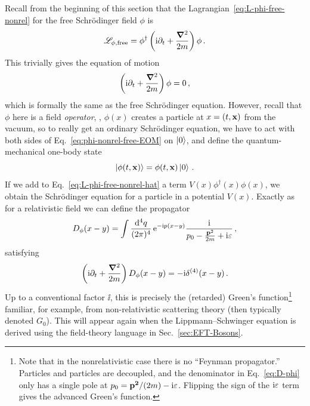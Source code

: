 Recall from the beginning of this section that the 
Lagrangian~\eqref{eq:L-phi-free-nonrel} for the free Schr\"odinger field 
$\phi$ is
%
\begin{equation}
 \LL_{\phi,\text{free}} = \phi^\dagger
 \left(\ii\partial_t + \frac{\Laplace}{2m}\right)\phi \,.
\label{eq:L-phi-free-nonrel-hat}
\end{equation}
%
This trivially gives the equation of motion
%
\begin{equation}
 \left(\ii\partial_t + \frac{\Laplace}{2m}\right)\phi = 0 \,,
\label{eq:phi-nonrel-free-EOM}
\end{equation}
%
which is formally the same as the free Schr\"odinger equation.  However, recall 
that $\phi$ here is a field \emph{operator}, \ie, $\phi(x)$ creates a particle 
at $x=(t,\mathbf{x})$ from the vacuum, so to really get an ordinary Schr\"odinger 
equation, we have to act with both sides of Eq.~\eqref{eq:phi-nonrel-free-EOM} 
on $\ket{0}$, and define the quantum-mechanical one-body state
%
\begin{equation}
 \ket{\phi(t,\mathbf{x})} = \phi(t,\mathbf{x})\ket{0} \,.
\end{equation}
%
If we add to Eq.~\eqref{eq:L-phi-free-nonrel-hat} a term 
$V(x)\phi^\dagger(x)\phi(x)$, we obtain the Schr\"odinger equation for a 
particle in a potential $V(x)$.  Exactly as for a relativistic field we can 
define the propagator
%
\begin{equation}
 D_\phi(x-y)
 = \int\frac{\dd^4q}{(2\pi)^4} \, \eex^{{-}\ii p(x-y)}
 \frac{\ii}{p_0-\frac{{\mathbf{p}}^2}{2m} + \ii\eps} \,,
\label{eq:D-phi}
\end{equation}
%
satisfying
%
\begin{equation}
 \left(\mathrm{i}\partial_t + \frac{\boldsymbol{\nabla}^2}{2m}\right)D_\phi(x-y)
 = {-}\mathrm{i} \delta^{(4)}(x-y) \,.
\end{equation}
%
Up to a conventional factor $\ii$, this is precisely the (retarded) Green's 
function\footnote{Note that in the nonrelativistic case there is no ``Feynman 
propagator.''  Particles and particles are decoupled, and the denominator in 
Eq.~\eqref{eq:D-phi} only has a single pole at $p_0=\vec{{\mathbf{p}}^2}/(2m)-\ii\eps$.  
Flipping the sign of the $\mathrm{i}\varepsilon$ term gives the advanced Green's function.} 
familiar, for example, from non-relativistic scattering theory (then typically 
denoted $G_0$).  This will appear again when the Lippmann--Schwinger equation 
is derived using the field-theory language in Sec.~\ref{sec:EFT-Bosons}.

